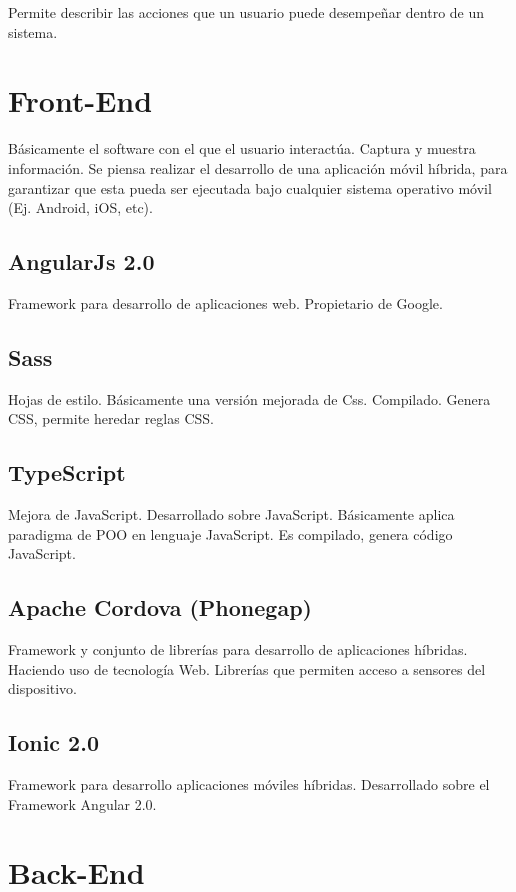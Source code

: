 Permite describir las acciones que un usuario puede desempeñar dentro de un sistema.

\section{Front-End}

Básicamente el software con el que el usuario interactúa. Captura y muestra información. Se piensa realizar el desarrollo de una aplicación móvil híbrida, para garantizar que esta pueda ser ejecutada bajo cualquier sistema operativo móvil (Ej. Android, iOS, etc).

\subsection{AngularJs 2.0}

Framework para desarrollo de aplicaciones web. Propietario de Google.

\subsection{Sass}

Hojas de estilo. Básicamente una versión mejorada de Css. Compilado. Genera CSS, permite heredar reglas CSS.

\subsection{TypeScript}

Mejora de JavaScript. Desarrollado sobre JavaScript. Básicamente aplica paradigma de POO en lenguaje JavaScript. Es compilado, genera código JavaScript.

\subsection{Apache Cordova (Phonegap)}

Framework y conjunto de librerías para desarrollo de aplicaciones híbridas. Haciendo uso de tecnología Web. Librerías que permiten acceso a sensores del dispositivo.

\subsection{Ionic 2.0}

Framework para desarrollo aplicaciones móviles híbridas. Desarrollado sobre el Framework Angular 2.0. 

\section{Back-End}

